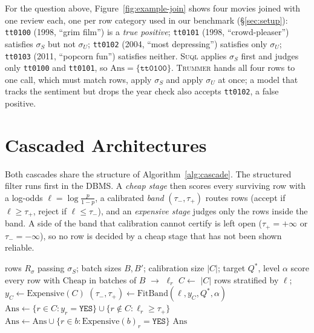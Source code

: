 \documentclass[sigconf]{acmart}
\begin{document}
\begin{example}
\label{ex:running}
For the question above, Figure~\ref{fig:example-join} shows four movies joined with one review each, one per row category used in our benchmark (\S\ref{sec:setup}): \texttt{tt0100} (1998, ``grim film'') is a \emph{true positive}; \texttt{tt0101} (1998, ``crowd-pleaser'') satisfies $\sigma_S$ but not $\sigma_U$; \texttt{tt0102} (2004, ``most depressing'') satisfies only $\sigma_U$; \texttt{tt0103} (2011, ``popcorn fun'') satisfies neither. \textsc{Suql} applies $\sigma_S$ first and judges only \texttt{tt0100} and \texttt{tt0101}, so $\mathrm{Ans}=\{\texttt{tt0100}\}$. \textsc{Trummer} hands all four rows to one call, which must match rows, apply $\sigma_S$ and apply $\sigma_U$ at once; a model that tracks the sentiment but drops the year check also accepts \texttt{tt0102}, a false positive.
\end{example}

\section{Cascaded Architectures}
\label{sec:contributions}

Both cascades share the structure of Algorithm~\ref{alg:cascade}. The structured filter runs first in the DBMS. A \emph{cheap stage} then scores every surviving row with a log-odds $\ell = \log\frac{p}{1-p}$, a calibrated \emph{band} $(\tau_-,\tau_+)$ routes rows (accept if $\ell \ge \tau_+$, reject if $\ell \le \tau_-$), and an \emph{expensive stage} judges only the rows inside the band. A side of the band that calibration cannot certify is left open ($\tau_+{=}{+}\infty$ or $\tau_-{=}{-}\infty$), so no row is decided by a cheap stage that has not been shown reliable.

\begin{algorithm}[t]
\caption{Cascade (\textsc{CasSuql}: $B{=}B'{=}1$; \textsc{CasTrummer}: batches $B$, $B'$)}
\label{alg:cascade}
\begin{algorithmic}[1]
\Require rows $R_\sigma$ passing $\sigma_S$; batch sizes $B,B'$; calibration size $|C|$; target $Q^\ast$, level $\alpha$
\State score every row with $\mathrm{Cheap}$ in batches of $B$ $\to$ $\ell_r$
\State $C \gets$ $|C|$ rows stratified by $\ell$; $y_C \gets \mathrm{Expensive}(C)$ 
\State $(\tau_-,\tau_+) \gets \mathrm{FitBand}(\ell, y_C, Q^\ast, \alpha)$ \Comment{\S\ref{sec:cascade-math}}
\State $\mathrm{Ans} \gets \{r \in C: y_r{=}\texttt{YES}\} \cup \{r \notin C: \ell_r \ge \tau_+\}$
  \State $\mathrm{Ans} \gets \mathrm{Ans} \cup \{r \in b : \mathrm{Expensive}(b)_r = \texttt{YES}\}$ 
\EndFor
\State \Return $\mathrm{Ans}$
\end{algorithmic}
\end{algorithm}
\end{document}
